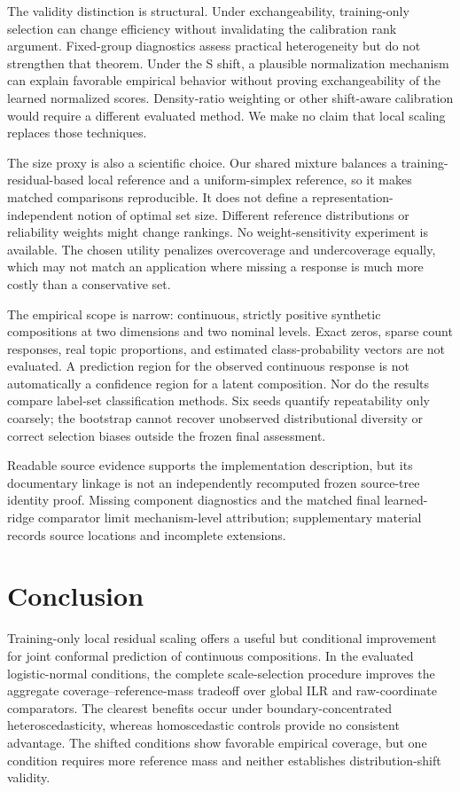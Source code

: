 \documentclass{article}
\begin{document}
The validity distinction is structural. Under exchangeability, training-only selection can change efficiency without invalidating the calibration rank argument. Fixed-group diagnostics assess practical heterogeneity but do not strengthen that theorem. Under the S shift, a plausible normalization mechanism can explain favorable empirical behavior without proving exchangeability of the learned normalized scores. Density-ratio weighting or other shift-aware calibration would require a different evaluated method. We make no claim that local scaling replaces those techniques.

The size proxy is also a scientific choice. Our shared mixture balances a training-residual-based local reference and a uniform-simplex reference, so it makes matched comparisons reproducible. It does not define a representation-independent notion of optimal set size. Different reference distributions or reliability weights might change rankings. No weight-sensitivity experiment is available. The chosen utility penalizes overcoverage and undercoverage equally, which may not match an application where missing a response is much more costly than a conservative set.

The empirical scope is narrow: continuous, strictly positive synthetic compositions at two dimensions and two nominal levels. Exact zeros, sparse count responses, real topic proportions, and estimated class-probability vectors are not evaluated. A prediction region for the observed continuous response is not automatically a confidence region for a latent composition. Nor do the results compare label-set classification methods. Six seeds quantify repeatability only coarsely; the bootstrap cannot recover unobserved distributional diversity or correct selection biases outside the frozen final assessment.

Readable source evidence supports the implementation description, but its documentary linkage is not an independently recomputed frozen source-tree identity proof. Missing component diagnostics and the matched final learned-ridge comparator limit mechanism-level attribution; supplementary material records source locations and incomplete extensions.

\section{Conclusion}
Training-only local residual scaling offers a useful but conditional improvement for joint conformal prediction of continuous compositions. In the evaluated logistic-normal conditions, the complete scale-selection procedure improves the aggregate coverage--reference-mass tradeoff over global ILR and raw-coordinate comparators. The clearest benefits occur under boundary-concentrated heteroscedasticity, whereas homoscedastic controls provide no consistent advantage. The shifted conditions show favorable empirical coverage, but one condition requires more reference mass and neither establishes distribution-shift validity.
\end{document}
